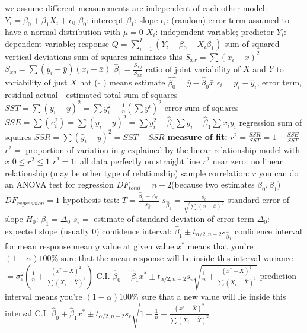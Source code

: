 \documentclass{article}
\begin{document}
\begin{multicols*}{2}
\begin{outline}[compactitem]
  \1 we assume different measurements are independent of each other
  \1 model: $Y_i=\beta_0 + \beta_1 X_i + \epsilon_0$
    \2 $\beta_0$: intercept
    \2 $\beta_1$: slope
    \2 $\epsilon_i$: (random) error term
      \3 assumed to have a normal distribution with $\mu=0$
    \2 $X_i$: independent variable; predictor
    \2 $Y_i$: dependent variable; response
  \1 $Q = \sum_{i=1}^{I} ( Y_i - \beta_0 - X_i\beta_1 )$
    \2 sum of squared vertical deviations
    \2 sum-of-squares minimizes this
  \1 $S_{xx} = \sum(x_i - \bar{x})^2$
  \1 $S_{xy} = \sum(y_i - \bar{y})(x_i - \bar{x})$
  \1 $\hat{\beta}_1 = \frac{S_{xy}}{S_{xx}}$ ratio of joint variability of $X$ and $Y$ to variability of just $X$
    \2 hat ( $\hat{}$ ) means estimate
  \1 $\hat{\beta_0} = \bar{y}-\hat{\beta}_0\bar{x}$
  \1 $\epsilon_i = y_i - \hat{y}_i$, error term, residual
    \2 actual - estimated
  \1 total sum of squares $SST = \sum(y_i - \bar{y})^2 = \sum y_i^2 - \frac{1}{n}(\sum y^i)^2$
  \1 error sum of squares$SSE 
    = \sum (e_i^2) 
    = \sum (y_i - \bar{y})^2 
    = \sum y_i^2 - \hat{\beta}_0\sum y_i - \hat{\beta}_1\sum x_i y_i
    $
  \1 regression sum of squares $SSR = \sum (\hat{y}_i - \bar{y})^2 = SST-SSR $
  \1 \textbf{measure of fit:} $r^2 = \frac{SSR}{SST} = 1- \frac{SSE}{SST}$
  \2 $r^2=$ proportion of variation in $y$ explained by the linear relationship model with $x$
    \2 $0 \leq r^2 \leq 1$
    \2 $r^2 = 1$: all data perfectly on straight line
    \2 $r^2$ near zero: no linear relationship (may be other type of relationship)
  \1 sample correlation: $r$
  \1 you can do an ANOVA test for regression
    \2 $DF_{total} = n-2$(because two estimates $\beta_0, \beta_1$)
    \2 $DF_{regression} = 1$
  \1 hypothesis test: $T = \frac{\hat{\beta}_1 - \Delta_0}{s_\hat{\beta}_1}$
    \2 $s_\hat{\beta}_1 = \frac{s_\epsilon}{\sqrt{\sum(x-\bar{x})^2}}$ standard error of slope
    \2 $H_0$: $\beta_1 = \Delta_0$
    \2 $s_\epsilon = $ estimate of standard deviation of error term
    \2 $\Delta_0$: expected slope (usually 0)
    \2 confidence interval: $\hat{\beta}_1 \pm t_{\alpha/2, n-2} s_\hat{\beta}_1$
  \1 confidence interval for mean response
    \2 mean $y$ value at given value $x^*$
    \2 means that you're $(1-\alpha)100\%$ sure that the mean response will be inside this interval
    \2 variance $=\sigma_{\epsilon}^2\left( \frac{1}{n} + \frac{(x^* - \bar{X})^2 }{\sum(X_i - \bar{X})^2 } \right)$
    \2 C.I. $\hat{\beta}_0 
      + \hat{\beta}_1 x^* 
      \pm t_{\alpha/2, n-2} s_\epsilon \sqrt{ \frac{1}{n} + \frac{(x^* - \bar{X})^2 }{\sum(X_i - \bar{X})^2 } }$
  \1 prediction interval
    \2 means you're $(1-\alpha)100\%$ sure that a new value will lie inside this interval
    \2 C.I. $\hat{\beta}_0 
      + \hat{\beta}_1 x^* 
      \pm t_{\alpha/2, n-2} s_\epsilon \sqrt{ 1 + \frac{1}{n} + \frac{(x^* - \bar{X})^2 }{\sum(X_i - \bar{X})^2 } }$




\end{outline}
\end{multicols*}
\end{document}
